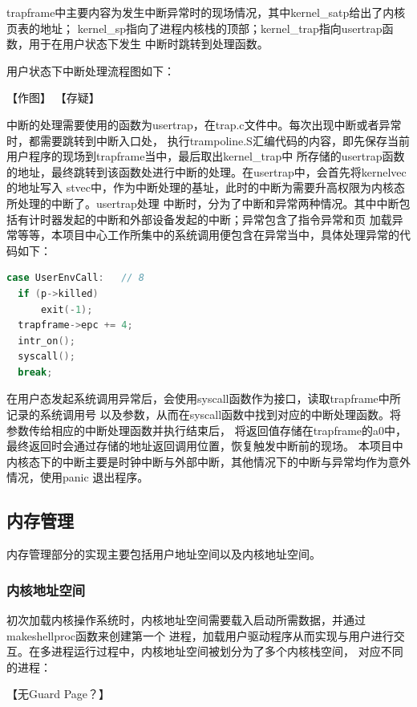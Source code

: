\documentclass[UTF8,a4paper,10pt]{ctexart}
\begin{document}
trapframe中主要内容为发生中断异常时的现场情况，其中kernel\_satp给出了内核页表的地址；
kernel\_sp指向了进程内核栈的顶部；kernel\_trap指向usertrap函数，用于在用户状态下发生
中断时跳转到处理函数。

用户状态下中断处理流程图如下：

【作图】
【存疑】

中断的处理需要使用的函数为usertrap，在trap.c文件中。每次出现中断或者异常时，都需要跳转到中断入口处，
执行trampoline.S汇编代码的内容，即先保存当前用户程序的现场到trapframe当中，最后取出kernel\_trap中
所存储的usertrap函数的地址，最终跳转到该函数处进行中断的处理。在usertrap中，会首先将kernelvec的地址写入
stvec中，作为中断处理的基址，此时的中断为需要升高权限为内核态所处理的中断了。usertrap处理
中断时，分为了中断和异常两种情况。其中中断包括有计时器发起的中断和外部设备发起的中断；异常包含了指令异常和页
加载异常等等，本项目中心工作所集中的系统调用便包含在异常当中，具体处理异常的代码如下：

\begin{lstlisting}[title=系统调用异常,frame=trbl,language={C}]
  case UserEnvCall:   // 8
  if (p->killed)
      exit(-1);
  trapframe->epc += 4;
  intr_on();
  syscall();
  break;
  \end{lstlisting}

在用户态发起系统调用异常后，会使用syscall函数作为接口，读取trapframe中所记录的系统调用号
以及参数，从而在syscall函数中找到对应的中断处理函数。将参数传给相应的中断处理函数并执行结束后，
将返回值存储在trapframe的a0中，最终返回时会通过存储的地址返回调用位置，恢复触发中断前的现场。
本项目中内核态下的中断主要是时钟中断与外部中断，其他情况下的中断与异常均作为意外情况，使用panic
退出程序。

\subsection{内存管理}

内存管理部分的实现主要包括用户地址空间以及内核地址空间。

\subsubsection{内核地址空间}

初次加载内核操作系统时，内核地址空间需要载入启动所需数据，并通过makeshellproc函数来创建第一个
进程，加载用户驱动程序从而实现与用户进行交互。在多进程运行过程中，内核地址空间被划分为了多个内核栈空间，
对应不同的进程：

【无Guard Page？】
\end{document}
